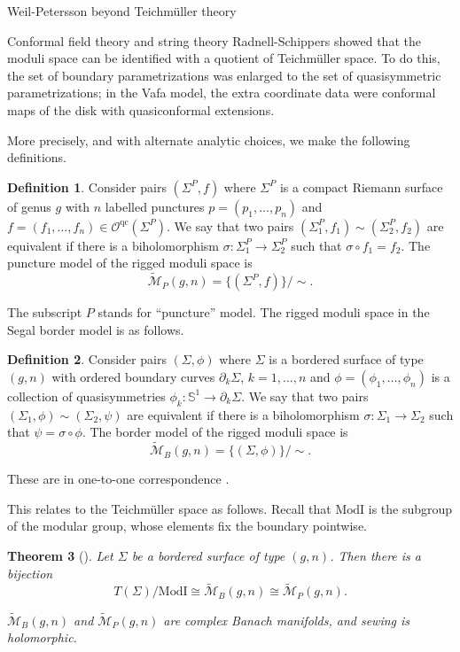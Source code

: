 \documentclass[12pt]{amsart}
\newcommand{\riem}{\Sigma}  %
\theoremstyle{plain}
\newtheorem{theorem}{Theorem}[section]
\theoremstyle{definition}
\newtheorem{definition}[theorem]{Definition}
\theoremstyle{remark}
\numberwithin{equation}{section} %
\numberwithin{figure}{section} %
\begin{document}
\begin{section}{Weil-Petersson beyond Teichm\"uller theory}
\begin{subsection}{Conformal field theory and string theory}
  Radnell-Schippers \cite{RadnellSchippers_monster} showed that the moduli space can be identified with a quotient of Teichm\"uller space. To do this, the set of boundary parametrizations was enlarged to the set of quasisymmetric parametrizations; in the Vafa model, the extra coordinate data were conformal maps of the disk with quasiconformal extensions. 
  
  More precisely, and with alternate analytic choices, we make the following definitions.
\begin{definition} 
 Consider pairs $(\riem^P,f)$ where $\riem^P$ is a compact Riemann surface of genus $g$ with $n$ labelled punctures $p=(p_1,\ldots,p_n)$ and  $f=(f_1,\ldots,f_n) \in \mathcal{O}^{\mathrm{qc}}({\riem}^P)$. We say that two pairs $(\riem^P_1,f_1)\sim (\riem^P_2,f_2)$ are equivalent if there is a biholomorphism $\sigma:\riem^P_1 \rightarrow \riem^P_2$ such that $\sigma \circ f_1 = f_2$.  The puncture model of the rigged moduli space is 
 \[ \widetilde{\mathcal{M}}_P(g,n) = \{ (\riem^P,f) \}/\sim.   \]
\end{definition}  
The subscript $P$ stands for ``puncture'' model.  
The rigged moduli space in the Segal border model is as follows. 
\begin{definition} Consider pairs $(\riem,\phi)$ where $\riem$ is a bordered surface of type $(g,n)$ with ordered boundary curves $\partial_k \riem$, $k=1,\ldots,n$ and $\phi=(\phi_1,\ldots,\phi_n)$ is a collection of
quasisymmetries $\phi_k:\mathbb{S}^1 \rightarrow \partial_k \riem$. We say that two pairs $(\riem_1,\phi) \sim (\riem_2,\psi)$ are equivalent if there is a biholomorphism $\sigma:\riem_1 \rightarrow \riem_2$ such that $\psi=\sigma \circ \phi$. The border model of the rigged moduli space is 
\[ \widetilde{\mathcal{M}}_B(g,n) = \{ (\riem,\phi) \}/\sim.   \]
\end{definition}
These are in one-to-one correspondence \cite{RadnellSchippers_monster}. 

This relates to the Teichm\"uller space as follows. Recall that $\mathrm{ModI}$ is the subgroup of the modular group, whose elements fix the boundary pointwise.
\begin{theorem}[\cite{RadnellSchippers_monster}] \label{th:RMS_Teich_corresp} 
 Let $\riem$ be a bordered surface of type $(g,n)$. Then there is a bijection  
 \[  T(\riem)/\mathrm{ModI} \cong \widetilde{\mathcal{M}}_B(g,n) \cong \widetilde{\mathcal{M}}_P(g,n).   \]

 $\widetilde{\mathcal{M}}_B(g,n)$ and  $\widetilde{\mathcal{M}}_P(g,n)$ are complex Banach manifolds, and sewing is holomorphic. 
\end{theorem}


\end{subsection}
\end{section}
\end{document}
